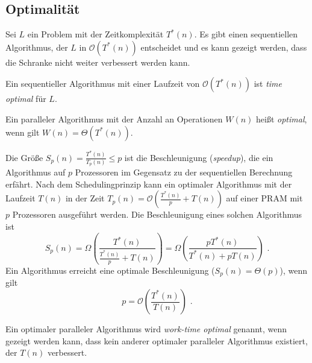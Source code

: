 \subsection{Optimalität}
Sei $L$ ein Problem mit der Zeitkomplexität $T^\ast(n)$.
Es gibt einen sequentiellen Algorithmus, der $L$ in $\mathcal{O}(T^\ast(n))$
entscheidet und es kann gezeigt werden, dass die Schranke nicht weiter
verbessert werden kann.
%
\begin{define}
    Ein sequentieller Algorithmus mit einer Laufzeit von
    $\mathcal{O}(T^\ast(n))$ ist \emph{time optimal} für $L$.
\end{define}
%
\begin{define}
    Ein paralleler Algorithmus mit der Anzahl an Operationen $W(n)$ heißt
    \emph{optimal}, wenn gilt $W(n) = \Theta(T^\ast(n))$.
\end{define}
%
Die Größe $S_p(n) = \frac{T^\ast(n)}{T_p(n)} \leq p$ ist die Beschleunigung
(\emph{speedup}), die ein Algorithmus auf $p$ Prozessoren im Gegensatz zu der
sequentiellen Berechnung erfährt.
Nach dem Schedulingprinzip kann ein optimaler Algorithmus mit der 
Laufzeit $T(n)$ in der Zeit
$T_p(n) = \mathcal{O} \left( \frac{T^\ast(n)}{p} + T(n) \right)$
auf einer PRAM mit $p$ Prozessoren ausgeführt werden.
Die Beschleunigung eines solchen Algorithmus ist
\begin{equation}
    S_p(n) = \Omega \left( \frac{T^\ast(n)}{\frac{T^\ast(n)}{p} + T(n)} \right)
    = \Omega \left( \frac{pT^\ast(n)}{T^\ast(n) + pT(n)} \right) \text{ .}
\end{equation}
Ein Algorithmus erreicht eine optimale Beschleunigung ($S_p(n) = \Theta(p)$),
wenn gilt
\begin{equation}
    p = \mathcal{O} \left( \frac{T^\ast(n)}{T(n)} \right) \text{ .}
\end{equation}
%
\begin{define}
    Ein optimaler paralleler Algorithmus wird \emph{work-time optimal} genannt,
    wenn gezeigt werden kann, dass kein anderer optimaler paralleler
    Algorithmus existiert, der $T(n)$ verbessert.
\end{define}
\cite[S.3,32]{jaja}
